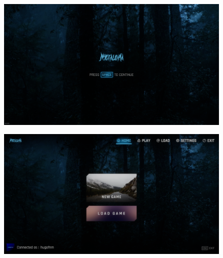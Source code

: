 \begin{figure}[H]
\centering
\begin{minipage}{.5\textwidth}
  \centering
  \includegraphics[width=.9\linewidth]{img/ui/UI2.png}
  \label{fig:uihome}
\end{minipage}%
\begin{minipage}{.5\textwidth}
  \centering
  \includegraphics[width=.9\linewidth]{img/ui/UI1.png}
  \label{fig:uihome2}
\end{minipage}
\end{figure}

